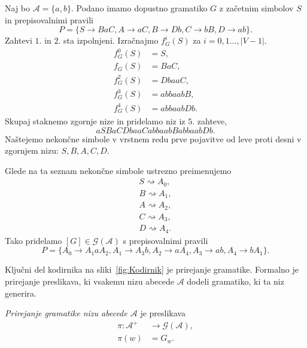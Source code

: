 \documentclass[fin1, tisk]{fmfdelo}
\providecommand{\abs}[1]{\left\lvert #1 \right\rvert}
\newcommand{\A}{\mathcal{A}}
\newcommand{\G}{\mathcal{G}}
\theoremstyle{definition}
\begin{document}
\begin{primer}\label{primer:kanonična}
    Naj bo $\A = \{ a,b \}$. Podano imamo dopustno gramatiko $G$ z začetnim simbolov $S$ in 
    prepisovalnimi pravili
    \[
        P = \{ S \rightarrow \mathit{BaC}, A \rightarrow \mathit{aC}, B \rightarrow 
        \mathit{Db}, C \rightarrow \mathit{bB}, D \rightarrow{ab} \}.
    \]
    Zahtevi $1.$ in $2.$ sta izpolnjeni. Izračnajmo $f^i_G(S)$ za $i = 0,1 \ldots, \abs{V-1}$.
    \begin{align*}
        f_G^0(S) &= S, \\
        f_G(S) &= \mathit{BaC}, \\
        f^2_G(S) &= \mathit{DbaaC}, \\
        f^3_G(S) &= \mathit{abbaabB}, \\
        f^4_G(S) &= \mathit{abbaabDb}.
    \end{align*}
    Skupaj staknemo zgornje nize in pridelamo niz iz $5.$ zahteve,
    \[
a        \mathit{SBaCDbaaCabbaabBabbaabDb}.
    \]
    Naštejemo nekončne simbole v vrstnem redu prve pojavitve od leve proti desni v zgornjem nizu:
    $S, B, A, C, D$. 
    
    Glede na ta seznam nekončne simbole ustrezno preimenujemo
    \begin{gather*}
        S \rightsquigarrow A_0, \\
        B \rightsquigarrow A_1, \\
        A \rightsquigarrow A_2, \\
        C \rightsquigarrow A_3, \\
        D \rightsquigarrow A_4.
    \end{gather*}
    Tako pridelamo $[G] \in \G(\A)$ s prepisovalnimi pravili
    \[
        P = \{ A_0 \rightarrow A_1aA_2, A_1 \rightarrow A_3b, A_2 \rightarrow aA_4,
        A_3 \rightarrow ab, A_4 \rightarrow bA_1 \}.
    \]
\end{primer}

Ključni del kodirnika na sliki~\ref{fig:Kodirnik} je prirejanje gramatike. Formalno je prirejanje
preslikava, ki vsakemu nizu abecede $\A$ dodeli gramatiko, ki ta niz generira.

\begin{definicija}
    \emph{Prirejanje gramatike nizu abecede $\A$} je preslikava
    \begin{align*}
        \pi \colon \A^+ &\to \G(\A), \\
        \pi(w) &= G_w.
    \end{align*}
\end{definicija}
\end{document}
